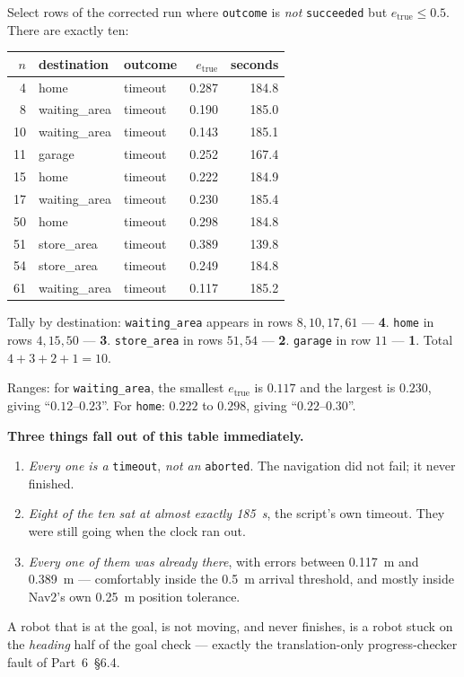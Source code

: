 \documentclass[11pt,a4paper]{report}
\newcommand{\file}[1]{\texttt{\small #1}}
\begin{document}
\begin{handbox}
Select rows of the corrected run where \file{outcome} is \emph{not}
\file{succeeded} but $e_{\text{true}} \le 0.5$. There are exactly ten:

\begin{center}
\small
\begin{tabular}{@{}rllrr@{}}
\toprule
$n$ & destination & outcome & $e_{\text{true}}$ & seconds \\
\midrule
 4 & home          & timeout & 0.287 & 184.8 \\
 8 & waiting\_area & timeout & 0.190 & 185.0 \\
10 & waiting\_area & timeout & 0.143 & 185.1 \\
11 & garage        & timeout & 0.252 & 167.4 \\
15 & home          & timeout & 0.222 & 184.9 \\
17 & waiting\_area & timeout & 0.230 & 185.4 \\
50 & home          & timeout & 0.298 & 184.8 \\
51 & store\_area   & timeout & 0.389 & 139.8 \\
54 & store\_area   & timeout & 0.249 & 184.8 \\
61 & waiting\_area & timeout & 0.117 & 185.2 \\
\bottomrule
\end{tabular}
\end{center}

Tally by destination: \file{waiting\_area} appears in rows $8, 10, 17, 61$ ---
\textbf{4}. \file{home} in rows $4, 15, 50$ --- \textbf{3}.
\file{store\_area} in rows $51, 54$ --- \textbf{2}. \file{garage} in row
$11$ --- \textbf{1}. Total $4+3+2+1 = 10$. \checkmark

Ranges: for \file{waiting\_area}, the smallest $e_{\text{true}}$ is $0.117$
and the largest is $0.230$, giving ``$0.12$--$0.23$''. \checkmark\;
For \file{home}: $0.222$ to $0.298$, giving ``$0.22$--$0.30$''. \checkmark

\medskip
\textbf{Three things fall out of this table immediately.}
\begin{enumerate}[leftmargin=1.6em,itemsep=2pt]
\item \emph{Every one is a} \file{timeout}, \emph{not an} \file{aborted}. The
navigation did not fail; it never finished.
\item \emph{Eight of the ten sat at almost exactly \SI{185}{\second}}, the
script's own timeout. They were still going when the clock ran out.
\item \emph{Every one of them was already there}, with errors between
\SI{0.117}{\metre} and \SI{0.389}{\metre} --- comfortably inside the
\SI{0.5}{\metre} arrival threshold, and mostly inside Nav2's own
\SI{0.25}{\metre} position tolerance.
\end{enumerate}
A robot that is at the goal, is not moving, and never finishes, is a robot
stuck on the \emph{heading} half of the goal check --- exactly the
translation-only progress-checker fault of Part~6~\S6.4.
\end{handbox}
\end{document}
